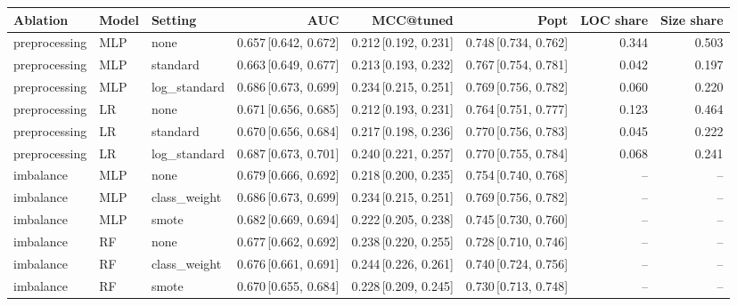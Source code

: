 \small
\begin{tabular}{lllrrrrr}
\toprule
Ablation & Model & Setting & AUC & MCC@tuned & Popt & LOC share & Size share \\
\midrule
preprocessing & MLP & none & 0.657\,{\scriptsize[0.642, 0.672]} & 0.212\,{\scriptsize[0.192, 0.231]} & 0.748\,{\scriptsize[0.734, 0.762]} & 0.344 & 0.503 \\
preprocessing & MLP & standard & 0.663\,{\scriptsize[0.649, 0.677]} & 0.213\,{\scriptsize[0.193, 0.232]} & 0.767\,{\scriptsize[0.754, 0.781]} & 0.042 & 0.197 \\
preprocessing & MLP & log\_standard & 0.686\,{\scriptsize[0.673, 0.699]} & 0.234\,{\scriptsize[0.215, 0.251]} & 0.769\,{\scriptsize[0.756, 0.782]} & 0.060 & 0.220 \\
preprocessing & LR & none & 0.671\,{\scriptsize[0.656, 0.685]} & 0.212\,{\scriptsize[0.193, 0.231]} & 0.764\,{\scriptsize[0.751, 0.777]} & 0.123 & 0.464 \\
preprocessing & LR & standard & 0.670\,{\scriptsize[0.656, 0.684]} & 0.217\,{\scriptsize[0.198, 0.236]} & 0.770\,{\scriptsize[0.756, 0.783]} & 0.045 & 0.222 \\
preprocessing & LR & log\_standard & 0.687\,{\scriptsize[0.673, 0.701]} & 0.240\,{\scriptsize[0.221, 0.257]} & 0.770\,{\scriptsize[0.755, 0.784]} & 0.068 & 0.241 \\
imbalance & MLP & none & 0.679\,{\scriptsize[0.666, 0.692]} & 0.218\,{\scriptsize[0.200, 0.235]} & 0.754\,{\scriptsize[0.740, 0.768]} & -- & -- \\
imbalance & MLP & class\_weight & 0.686\,{\scriptsize[0.673, 0.699]} & 0.234\,{\scriptsize[0.215, 0.251]} & 0.769\,{\scriptsize[0.756, 0.782]} & -- & -- \\
imbalance & MLP & smote & 0.682\,{\scriptsize[0.669, 0.694]} & 0.222\,{\scriptsize[0.205, 0.238]} & 0.745\,{\scriptsize[0.730, 0.760]} & -- & -- \\
imbalance & RF & none & 0.677\,{\scriptsize[0.662, 0.692]} & 0.238\,{\scriptsize[0.220, 0.255]} & 0.728\,{\scriptsize[0.710, 0.746]} & -- & -- \\
imbalance & RF & class\_weight & 0.676\,{\scriptsize[0.661, 0.691]} & 0.244\,{\scriptsize[0.226, 0.261]} & 0.740\,{\scriptsize[0.724, 0.756]} & -- & -- \\
imbalance & RF & smote & 0.670\,{\scriptsize[0.655, 0.684]} & 0.228\,{\scriptsize[0.209, 0.245]} & 0.730\,{\scriptsize[0.713, 0.748]} & -- & -- \\
\bottomrule
\end{tabular}
